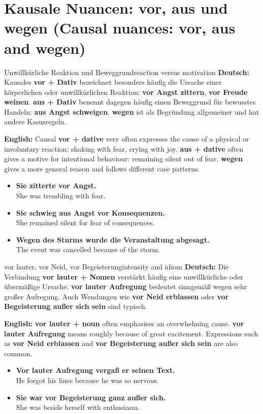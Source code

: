 \documentclass[a4paper,11pt]{article}
\newcommand{\GermanText}[1]{\textbf{Deutsch: }#1\par}
\newcommand{\EnglishText}[1]{{\small\color{SoftGray}\textbf{English: }#1\par}}
\newcommand{\ExampleItem}[2]{\item \textbf{#1}\\{\small\color{SoftGray}#2}}
\begin{document}
    \section{Kausale Nuancen: vor, aus und wegen (Causal nuances: vor, aus and wegen)}
        \begin{grammarentry}{Unwillkürliche Reaktion und Beweggrund}{reaction versus motivation}
            \GermanText{Kausales \textbf{vor + Dativ} bezeichnet besonders häufig die Ursache einer körperlichen oder unwillkürlichen Reaktion: \textbf{vor Angst zittern}, \textbf{vor Freude weinen}. \textbf{aus + Dativ} benennt dagegen häufig einen Beweggrund für bewusstes Handeln: \textbf{aus Angst schweigen}. \textbf{wegen} ist als Begründung allgemeiner und hat andere Kasusregeln.}
            \EnglishText{Causal \textbf{vor + dative} very often expresses the cause of a physical or involuntary reaction: shaking with fear, crying with joy. \textbf{aus + dative} often gives a motive for intentional behaviour: remaining silent out of fear. \textbf{wegen} gives a more general reason and follows different case patterns.}
        \end{grammarentry}
        \begin{exbox}
            \begin{itemize}
                \ExampleItem{Sie zitterte vor Angst.}{She was trembling with fear.}
                \ExampleItem{Sie schwieg aus Angst vor Konsequenzen.}{She remained silent for fear of consequences.}
                \ExampleItem{Wegen des Sturms wurde die Veranstaltung abgesagt.}{The event was cancelled because of the storm.}
            \end{itemize}
        \end{exbox}
        \begin{grammarentry}{vor lauter, vor Neid, vor Begeisterung}{intensity and idiom}
            \GermanText{Die Verbindung \textbf{vor lauter + Nomen} verstärkt häufig eine unwillkürliche oder übermäßige Ursache. \textbf{vor lauter Aufregung} bedeutet sinngemäß wegen sehr großer Aufregung. Auch Wendungen wie \textbf{vor Neid erblassen} oder \textbf{vor Begeisterung außer sich sein} sind typisch.}
            \EnglishText{\textbf{vor lauter + noun} often emphasises an overwhelming cause. \textbf{vor lauter Aufregung} means roughly because of great excitement. Expressions such as \textbf{vor Neid erblassen} and \textbf{vor Begeisterung außer sich sein} are also common.}
        \end{grammarentry}
        \begin{exbox}
            \begin{itemize}
                \ExampleItem{Vor lauter Aufregung vergaß er seinen Text.}{He forgot his lines because he was so nervous.}
                \ExampleItem{Sie war vor Begeisterung ganz außer sich.}{She was beside herself with enthusiasm.}
            \end{itemize}
        \end{exbox}
\end{document}
